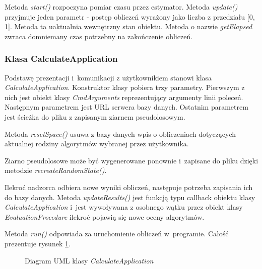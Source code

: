 \documentclass[../thesis.tex]{subfiles}
\begin{document}
Metoda \emph{start()} rozpoczyna pomiar czasu przez estymator. Metoda \emph{update()} przyjmuje jeden parametr - postęp obliczeń wyrażony jako liczba z przedziału [0, 1]. Metoda ta uaktualnia wewnętrzny stan obiektu. Metoda o nazwie \emph{getElapsed} zwraca domniemany czas potrzebny na zakończenie obliczeń.

\subsubsection{Klasa CalculateApplication}

Podstawę prezentacji i~komunikacji z użytkownikiem stanowi klasa \emph{CalculateApplication}. Konstruktor klasy pobiera trzy parametry. Pierwszym z nich jest obiekt klasy \emph{CmdArguments} reprezentujący argumenty linii poleceń. Następnym parametrem jest URL serwera bazy danych. Ostatnim parametrem jest ścieżka do pliku z zapisanym ziarnem pseudolosowym.

Metoda \emph{resetSpace()} usuwa z bazy danych wpis o obliczeniach dotyczących aktualnej rodziny algorytmów wybranej przez użytkownika. 

Ziarno pseudolosowe może być wygenerowane ponownie i~zapisane do pliku dzięki metodzie \emph{recreateRandomState()}.

Ilekroć nadzorca odbiera nowe wyniki obliczeń, następuje potrzeba zapisania ich do bazy danych. Metoda \emph{updateResults()} jest funkcją typu callback obiektu klasy \emph{CalculateApplication} i~jest wywoływana z osobnego wątku przez obiekt klasy \emph{EvaluationProcedure} ilekroć pojawią się nowe oceny algorytmów.

Metoda \emph{run()} odpowiada za uruchomienie obliczeń w~programie. Całość prezentuje rysunek \ref{proj:diagram_calculate_application}.

\begin{figure}[h]
\centering
{}
\caption{Diagram UML klasy \emph{CalculateApplication}}
\label{proj:diagram_calculate_application}
\end{figure}
\end{document}
